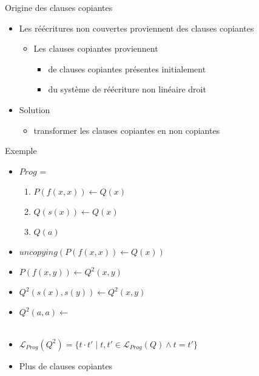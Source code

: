\begin{frame}{Origine des clauses copiantes}
  \begin{itemize}[<+->]
  \item Les réécritures non couvertes proviennent des clauses copiantes
    \begin{itemize}
    \item Les clauses copiantes proviennent
      \begin{itemize}
      \item de clauses copiantes présentes initialement
      \item du système de réécriture non linéaire droit
      \end{itemize}
    \end{itemize}
    \vspace{\baselineskip}
  \item Solution
    \begin{itemize}
    \item transformer les clauses copiantes en non copiantes
    \end{itemize}
  \end{itemize}
\end{frame}

\begin{frame}{Exemple}
  \begin{itemize}[<+->]
  \item $Prog$ =
    \begin{enumerate}
    \item $P(f(x,x)) \leftarrow Q(x)$
    \item {}$Q(s(x)) \leftarrow Q(x)$
    \item {}$Q(a) $
    \end{enumerate}
    \vspace{\baselineskip}

  \item $uncopying(P(f(x,x)) \leftarrow Q(x))$
  \item $P(f(x,y)) \leftarrow Q^2(x, y)$
  \item $Q^2(s(x),s(y)) \leftarrow Q^2(x,y)$
  \item $Q^2(a,a) \leftarrow $ \\~

  \item $\mathcal{L}_{Prog}(Q^2) = \{t \cdot t' \mid t,t' \in \mathcal{L}_{Prog}(Q) \wedge t = t'\}$
  \item Plus de clauses copiantes
  \end{itemize}
    
\end{frame}

